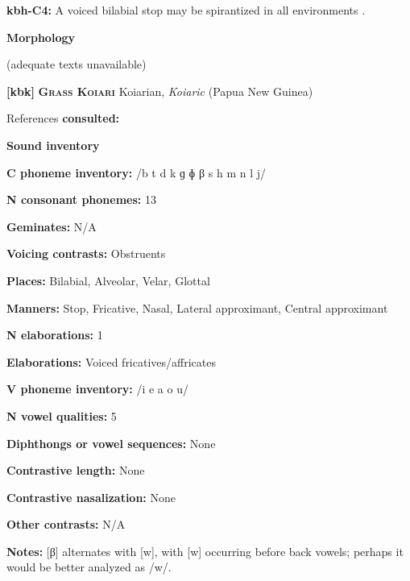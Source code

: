 \textbf{kbh-C4:} A voiced bilabial stop may be spirantized in all environments \citep[77]{Howard1967}.



\textbf{Morphology}



(adequate texts unavailable)



\textbf{[kbk]}   \textbf{\textsc{Grass Koiari}}    Koiarian, \textit{Koiaric} (Papua New Guinea)



References \textbf{consulted:} \citet{Dutton1996}



\textbf{Sound inventory}



\textbf{C phoneme inventory:} /b t d k ɡ ɸ β s h m n l j/



\textbf{N consonant phonemes:} 13



\textbf{Geminates:} N/A



\textbf{Voicing contrasts:} Obstruents



\textbf{Places:} Bilabial, Alveolar, Velar, Glottal



\textbf{Manners:} Stop, Fricative, Nasal, Lateral approximant, Central approximant



\textbf{N elaborations:} 1



\textbf{Elaborations:} Voiced fricatives/affricates



\textbf{V phoneme inventory:} /i e a o u/



\textbf{N vowel qualities:} 5



\textbf{Diphthongs or vowel sequences:} None



\textbf{Contrastive length:} None



\textbf{Contrastive nasalization:} None



\textbf{Other contrasts:} N/A



\textbf{Notes:} [β] alternates with [w], with [w] occurring before back vowels; perhaps it would be better analyzed as /w/.



